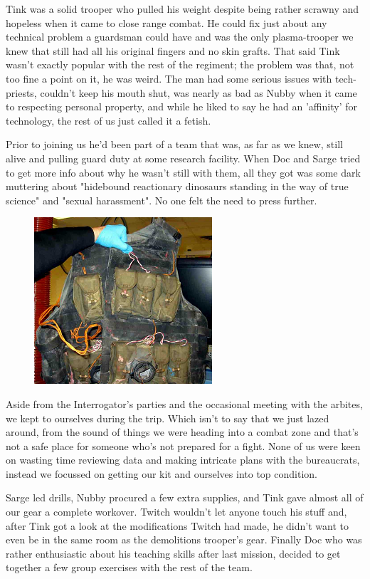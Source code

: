 Tink was a solid trooper who pulled his weight despite being rather scrawny and hopeless when it came to close range combat. 
He could fix just about any technical problem a guardsman could have and was the only plasma-trooper we knew that still had all his original fingers and no skin grafts. 
That said Tink wasn't exactly popular with the rest of the regiment; 
the problem was that, not too fine a point on it, he was weird. 
The man had some serious issues with tech-priests, couldn't keep his mouth shut, was nearly as bad as Nubby when it came to respecting personal property, and while he liked to say he had an 'affinity' for technology, the rest of us just called it a fetish.

Prior to joining us he'd been part of a team that was, as far as we knew, still alive and pulling guard duty at some research facility. 
When Doc and Sarge tried to get more info about why he wasn't still with them, all they got was some dark muttering about "hidebound reactionary dinosaurs standing in the way of true science" and "sexual harassment". 
No one felt the need to press further.

\begin{figure}
	\begin{center}
		\includegraphics[width=\figwidth]{pics/9/8.png}
	\end{center}
\end{figure}
Aside from the Interrogator's parties and the occasional meeting with the arbites, we kept to ourselves during the trip. 
Which isn't to say that we just lazed around, from the sound of things we were heading into a combat zone and that's not a safe place for someone who's not prepared for a fight. 
None of us were keen on wasting time reviewing data and making intricate plans with the bureaucrats, instead we focussed on getting our kit and ourselves into top condition.

Sarge led drills, Nubby procured a few extra supplies, and Tink gave almost all of our gear a complete workover. 
Twitch wouldn't let anyone touch his stuff and, after Tink got a look at the modifications Twitch had made, he didn't want to even be in the same room as the demolitions trooper's gear. 
Finally Doc who was rather enthusiastic about his teaching skills after last mission, decided to get together a few group exercises with the rest of the team.

